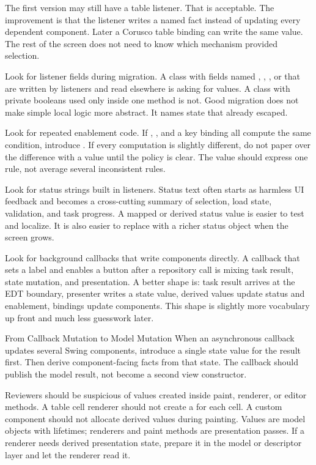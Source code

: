 The first version may still have a table listener. That is acceptable. The
improvement is that the listener writes a named fact instead of updating every
dependent component. Later a Corusco table binding can write the same value. The
rest of the screen does not need to know which mechanism provided selection.

Look for listener fields during migration. A class with fields named
, , , or  that are
written by listeners and read elsewhere is asking for values. A class with
private booleans used only inside one method is not. Good migration does not
make simple local logic more abstract. It names state that already escaped.

Look for repeated enablement code. If ,
, and a key binding all compute the same condition,
introduce . If every computation is slightly different, do not
paper over the difference with a value until the policy is clear. The value
should express one rule, not average several inconsistent rules.

Look for status strings built in listeners. Status text often starts as harmless
UI feedback and becomes a cross-cutting summary of selection, load state,
validation, and task progress. A mapped or derived status value is easier to
test and localize. It is also easier to replace with a richer status object when
the screen grows.

Look for background callbacks that write components directly. A callback that
sets a label and enables a button after a repository call is mixing task result,
state mutation, and presentation. A better shape is: task result arrives at the
EDT boundary, presenter writes a state value, derived values update status and
enablement, bindings update components. This shape is slightly more vocabulary
up front and much less guesswork later.

\begin{migrationbox}{From Callback Mutation to Model Mutation}
When an asynchronous callback updates several Swing components, introduce a
single state value for the result first. Then derive component-facing facts from
that state. The callback should publish the model result, not become a second
view constructor.
\end{migrationbox}

Reviewers should be suspicious of values created inside paint, renderer, or
editor methods. A table cell renderer should not create a  for
each cell. A custom component should not allocate derived values during painting.
Values are model objects with lifetimes; renderers and paint methods are
presentation passes. If a renderer needs derived presentation state, prepare it
in the model or descriptor layer and let the renderer read it.

